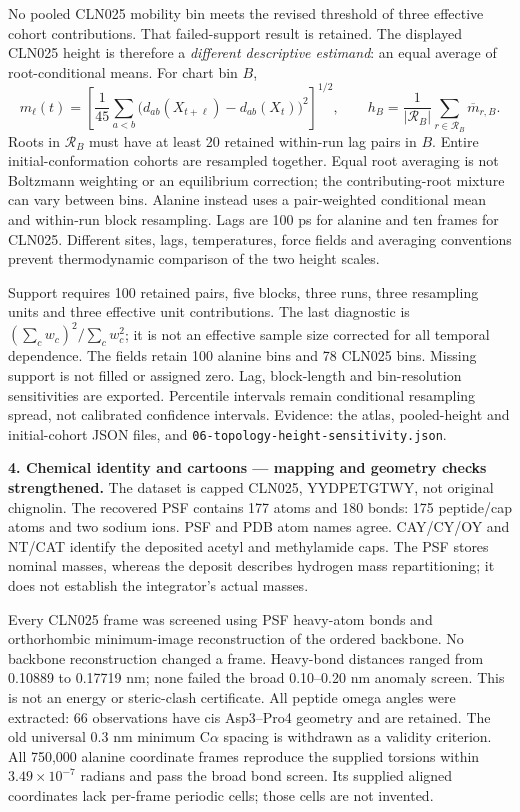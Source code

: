 \documentclass[11pt]{article}
\begin{document}
No pooled CLN025 mobility bin meets the revised threshold of three effective
cohort contributions. That failed-support result is retained. The displayed
CLN025 height is therefore a \emph{different descriptive estimand}: an equal
average of root-conditional means. For chart bin $B$,
\[
 m_\ell(t)=\left[\frac{1}{45}\sum_{a<b}
 \big(d_{ab}(X_{t+\ell})-d_{ab}(X_t)\big)^2\right]^{1/2},
 \qquad
 h_B=\frac{1}{|\mathcal R_B|}\sum_{r\in\mathcal R_B}\overline m_{r,B}.
\]
Roots in $\mathcal R_B$ must have at least 20 retained within-run lag pairs
in $B$. Entire initial-conformation cohorts are resampled together.
Equal root averaging is not Boltzmann weighting or an equilibrium correction;
the contributing-root mixture can vary between bins. Alanine instead uses
a pair-weighted conditional mean and within-run block resampling.
Lags are 100 ps for alanine and ten frames for CLN025. Different sites, lags,
temperatures, force fields and averaging conventions prevent thermodynamic
comparison of the two height scales.

Support requires 100 retained pairs, five blocks, three runs, three resampling
units and three effective unit contributions. The last diagnostic is
$(\sum_c w_c)^2/\sum_c w_c^2$; it is not an effective sample size corrected
for all temporal dependence. The fields retain 100 alanine bins and 78 CLN025
bins. Missing support is not filled or assigned zero. Lag, block-length and
bin-resolution sensitivities are exported. Percentile intervals remain
conditional resampling spread, not calibrated confidence intervals.
Evidence: the atlas, pooled-height and initial-cohort JSON files, and
\texttt{06-topology-height-sensitivity.json}.

\textbf{4. Chemical identity and cartoons --- mapping and geometry checks strengthened.}
The dataset is capped CLN025, YYDPETGTWY, not original chignolin.
The recovered PSF contains 177 atoms and 180 bonds: 175 peptide/cap atoms
and two sodium ions. PSF and PDB atom names agree. CAY/CY/OY and NT/CAT
identify the deposited acetyl and methylamide caps. The PSF stores nominal
masses, whereas the deposit describes hydrogen mass repartitioning; it does
not establish the integrator's actual masses.

Every CLN025 frame was screened using PSF heavy-atom bonds and orthorhombic
minimum-image reconstruction of the ordered backbone. No backbone reconstruction
changed a frame. Heavy-bond distances ranged from 0.10889 to 0.17719 nm;
none failed the broad 0.10--0.20 nm anomaly screen. This is not an energy
or steric-clash certificate. All peptide omega angles were extracted:
66 observations have cis Asp3--Pro4 geometry and are retained. The old universal
0.3 nm minimum C$\alpha$ spacing is withdrawn as a validity criterion.
All 750,000 alanine coordinate frames reproduce the supplied torsions within
$3.49\times10^{-7}$ radians and pass the broad bond screen. Its supplied
aligned coordinates lack per-frame periodic cells; those cells are not invented.
\end{document}
